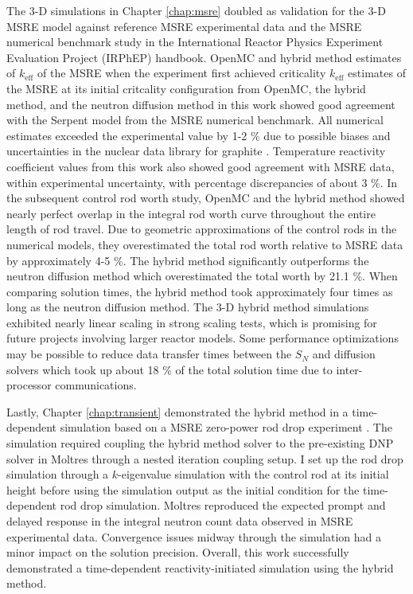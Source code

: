 The 3-D simulations in Chapter \ref{chap:msre} doubled as validation for the 3-D \gls{MSRE} model
against reference \gls{MSRE} experimental data and the \gls{MSRE} numerical benchmark study
\cite{fratoni_molten_2020} in
the International Reactor Physics Experiment Evaluation Project (IRPhEP) handbook. OpenMC and
hybrid method estimates of $k_\text{eff}$ of the \gls{MSRE} when the experiment first achieved criticality
$k_\text{eff}$ estimates of the \gls{MSRE} at its initial critcality configuration from OpenMC, the
hybrid method, and the neutron diffusion method in this work showed good agreement with the Serpent
model from the \gls{MSRE} numerical benchmark. All numerical estimates exceeded the experimental
value by 1-2 \% due to possible biases and uncertainties in the nuclear data library for graphite
\cite{fratoni_molten_2020}. Temperature reactivity coefficient values from this work also showed
good agreement with \gls{MSRE} data, within experimental uncertainty, with percentage discrepancies
of about 3 \%. In the subsequent control rod worth study, OpenMC and the hybrid method showed nearly
perfect overlap in the integral rod worth curve throughout the entire length of rod travel. Due to
geometric approximations of the control rods in the numerical models, they overestimated the total
rod worth relative to \gls{MSRE} data by approximately 4-5 \%. The hybrid method significantly
outperforms the neutron diffusion method which overestimated the total worth by 21.1 \%.
When comparing solution times, the hybrid method took approximately four times as long as the
neutron diffusion method.
The 3-D hybrid method simulations exhibited nearly linear scaling in strong scaling tests, which
is promising for future projects involving larger reactor models. Some performance optimizations
may be possible to reduce data transfer times between the $S_N$ and diffusion solvers which took
up about 18 \% of the total solution time due to inter-processor communications.

Lastly, Chapter \ref{chap:transient} demonstrated the hybrid method in a time-dependent simulation
based on a \gls{MSRE} zero-power rod drop experiment \cite{prince_zero-power_1968}.
The simulation required coupling the hybrid method solver to the pre-existing \gls{DNP} solver
in Moltres through a nested iteration coupling setup.
I set up the rod drop simulation through a
$k$-eigenvalue simulation with the control rod at its initial height before using the simulation
output as the initial condition for the time-dependent rod drop simulation. Moltres reproduced the
expected prompt and delayed response in the integral neutron count data observed in \gls{MSRE}
experimental data. Convergence issues midway through the simulation had a minor impact on the
solution precision. Overall, this work successfully demonstrated a time-dependent
reactivity-initiated simulation using the hybrid method.

